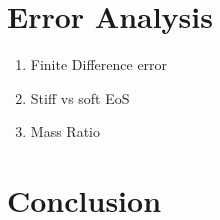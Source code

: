 \documentclass[%
twocolumn,
superscriptaddress,
nofootinbib,
 amsmath,amssymb,
 aps, prd
]{revtex4-2}
\begin{document}
\section{Error Analysis}
\begin{enumerate}
  \item Finite Difference error
  \item Stiff vs soft EoS
  \item Mass Ratio
\end{enumerate}

\section{Conclusion}




\end{document}
